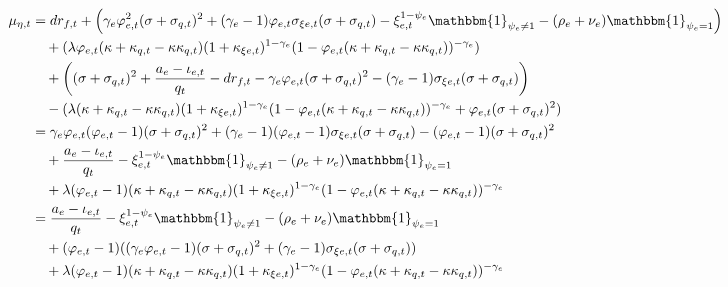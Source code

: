 \documentclass[12 pt, oneside]{article}
\theoremstyle{definition}
\theoremstyle{definition}
\theoremstyle{definition}
\begin{document}
\begin{align*}
\mu_{\eta, t} & = dr_{f, t} + \left(\gamma_e \varphi_{e, t}^2( \sigma + \sigma_{q, t})^2 + (\gamma_e - 1)\varphi_{e, t}\sigma_{\xi e, t} ( \sigma + \sigma_{q, t}) - \xi_{e, t}^{1 - \psi_e}\mathbbm{1}_{\psi_e\neq 1} - (\rho_e + \nu_e)\mathbbm{1}_{\psi_e = 1}  \right)\\
              &\quad + (\lambda\varphi_{e, t}(\kappa + \kappa_{q, t} - \kappa\kappa_{q, t})(1 + \kappa_{\xi e, t})^{ 1 - \gamma_e}(1 - \varphi_{e, t}(\kappa + \kappa_{q, t} - \kappa\kappa_{q, t}))^{ - \gamma_e})\\\
              &\quad  + \left((\sigma + \sigma_{q, t})^2 + \frac{a_e - \iota_{e, t}}{q_t} - dr_{f, t}  -\gamma_e\varphi_{e, t}(\sigma + \sigma_{q, t})^2 - (\gamma_e - 1)\sigma_{\xi e, t}(\sigma + \sigma_{q, t})\right)\\
              &\quad  - (\lambda(\kappa + \kappa_{q, t} - \kappa\kappa_{q, t})(1 + \kappa_{\xi e, t})^{1 - \gamma_e}(1 - \varphi_{e, t}(\kappa + \kappa_{q, t} - \kappa\kappa_{q, t}))^{ - \gamma_e} + \varphi_{e, t}(\sigma + \sigma_{q, t})^2)\\
              & =\gamma_e\varphi_{e, t}(\varphi_{e, t} - 1)(\sigma + \sigma_{q, t})^2 + (\gamma_e - 1)(\varphi_{e, t} - 1)\sigma_{\xi e, t}( \sigma + \sigma_{q, t})  - (\varphi_{e, t} - 1)(\sigma + \sigma_{q, t})^2\\
              &\quad + \frac{a_e - \iota_{e, t}}{q_t}- \xi_{e, t}^{1 - \psi_e}\mathbbm{1}_{\psi_e\neq 1} - (\rho_e + \nu_e)\mathbbm{1}_{\psi_e = 1}\\
              &\quad + \lambda (\varphi_{e, t} - 1)(\kappa + \kappa_{q, t} - \kappa\kappa_{q, t})(1 + \kappa_{\xi e, t})^{1 - \gamma_e}(1 - \varphi_{e, t}(\kappa + \kappa_{q, t} - \kappa\kappa_{q, t}))^{ - \gamma_e}\\
              & = \frac{a_e - \iota_{e, t}}{q_t}- \xi_{e, t}^{1 - \psi_e}\mathbbm{1}_{\psi_e\neq 1} - (\rho_e + \nu_e)\mathbbm{1}_{\psi_e = 1} \\
              &\quad +  (\varphi_{e, t} - 1)((\gamma_e\varphi_{e, t} - 1)(\sigma + \sigma_{q, t})^2 + (\gamma_e - 1)\sigma_{\xi e, t}(\sigma + \sigma_{q, t}))\\
              &\quad + \lambda (\varphi_{e, t} - 1)(\kappa + \kappa_{q, t} - \kappa\kappa_{q, t})(1 + \kappa_{\xi e, t})^{1 - \gamma_e}(1 - \varphi_{e, t}(\kappa + \kappa_{q, t} - \kappa\kappa_{q, t}))^{ - \gamma_e}
\end{align*}
\end{document}
